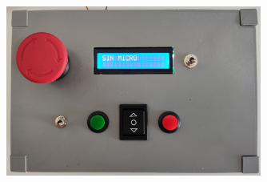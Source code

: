 \begin{figure}[hbtp]%
    \centering 
        \includegraphics[width=0.75\textwidth]{07-resultados/modosinmicro.jpg}
    \caption{}
    \label{fig:modosinmicro} 
\end{figure}
